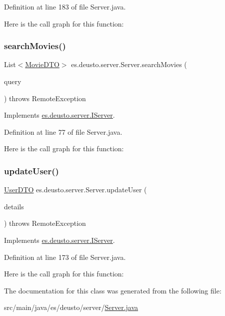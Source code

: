 Definition at line 183 of file Server.\+java.

Here is the call graph for this function\+:
\mbox{\label{classes_1_1deusto_1_1server_1_1_server_a16789cc76edd46978ffbb58581caf5db}} 
\subsubsection{\texorpdfstring{searchMovies()}{searchMovies()}}
{\footnotesize\ttfamily List$<$\mbox{\hyperlink{classes_1_1deusto_1_1server_1_1data_1_1_movie_d_t_o}{Movie\+D\+TO}}$>$ es.\+deusto.\+server.\+Server.\+search\+Movies (\begin{DoxyParamCaption}\item[{String}]{query }\end{DoxyParamCaption}) throws Remote\+Exception}



Implements \mbox{\hyperlink{interfacees_1_1deusto_1_1server_1_1_i_server_a50b7dacdeb04d5f1ee3f3b59989ed117}{es.\+deusto.\+server.\+I\+Server}}.



Definition at line 77 of file Server.\+java.

Here is the call graph for this function\+:
\mbox{\label{classes_1_1deusto_1_1server_1_1_server_a74082f91af2065cd600c147296090921}} 
\subsubsection{\texorpdfstring{updateUser()}{updateUser()}}
{\footnotesize\ttfamily \mbox{\hyperlink{classes_1_1deusto_1_1server_1_1data_1_1_user_d_t_o}{User\+D\+TO}} es.\+deusto.\+server.\+Server.\+update\+User (\begin{DoxyParamCaption}\item[{\mbox{\hyperlink{classes_1_1deusto_1_1server_1_1data_1_1_user_details_d_t_o}{User\+Details\+D\+TO}}}]{details }\end{DoxyParamCaption}) throws Remote\+Exception}



Implements \mbox{\hyperlink{interfacees_1_1deusto_1_1server_1_1_i_server_aff376200af975b145ac85ccfdf48a229}{es.\+deusto.\+server.\+I\+Server}}.



Definition at line 173 of file Server.\+java.

Here is the call graph for this function\+:


The documentation for this class was generated from the following file\+:\begin{DoxyCompactItemize}
\item 
src/main/java/es/deusto/server/\mbox{\hyperlink{_server_8java}{Server.\+java}}\end{DoxyCompactItemize}

